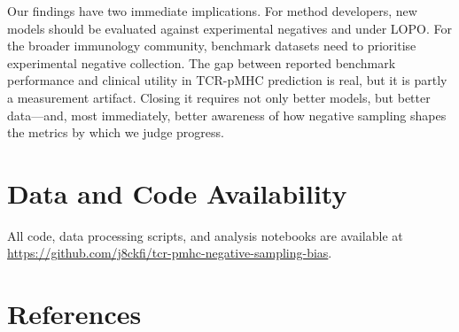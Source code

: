 \documentclass[11pt, a4paper]{article}
\begin{document}
Our findings have two immediate implications. For method developers, new models should be evaluated against experimental negatives and under LOPO. For the broader immunology community, benchmark datasets need to prioritise experimental negative collection. The gap between reported benchmark performance and clinical utility in TCR-pMHC prediction is real, but it is partly a measurement artifact. Closing it requires not only better models, but better data---and, most immediately, better awareness of how negative sampling shapes the metrics by which we judge progress.

\section*{Data and Code Availability}

All code, data processing scripts, and analysis notebooks are available at \url{https://github.com/j8ckfi/tcr-pmhc-negative-sampling-bias}.

\section*{References}
\end{document}
